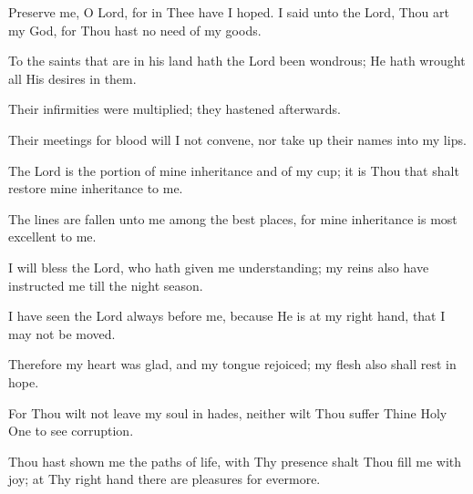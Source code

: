 Preserve me, O Lord, for in Thee have I hoped. I said unto the Lord, Thou art my God, for Thou hast no need of my goods.

To the saints that are in his land hath the Lord been wondrous; He hath wrought all His desires in them.

Their infirmities were multiplied; they hastened afterwards.

Their meetings for blood will I not convene, nor take up their names into my lips.

The Lord is the portion of mine inheritance and of my cup; it is Thou that shalt restore mine inheritance to me.

The lines are fallen unto me among the best places, for mine inheritance is most excellent to me.

I will bless the Lord, who hath given me understanding; my reins also have instructed me till the night season.

I have seen the Lord always before me, because He is at my right hand, that I may not be moved.

Therefore my heart was glad, and my tongue rejoiced; my flesh also shall rest in hope.

For Thou wilt not leave my soul in hades, neither wilt Thou suffer Thine Holy One to see corruption.

Thou hast shown me the paths of life, with Thy presence shalt Thou fill me with joy; at Thy right hand there are pleasures for evermore.
